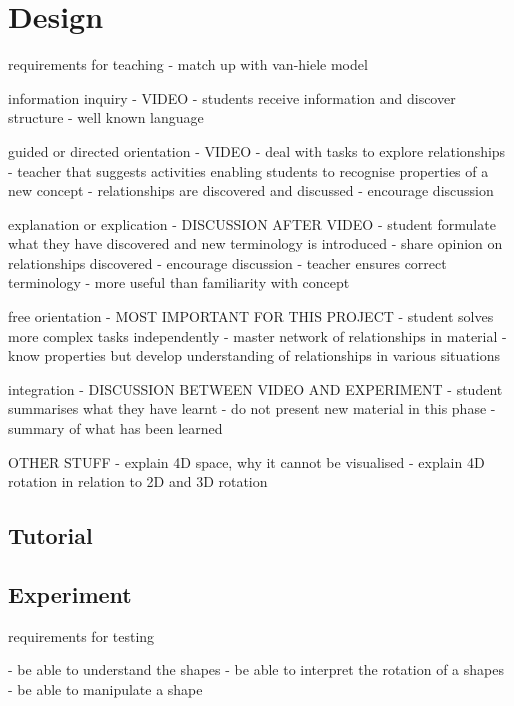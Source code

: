 \documentclass{l4proj}
\begin{document}
\chapter{Design}

requirements for teaching
 - match up with van-hiele model

 information inquiry - VIDEO
 - students receive information and discover structure
 - well known language

guided or directed orientation - VIDEO
 - deal with tasks to explore relationships
 - teacher that suggests activities enabling students to recognise properties of a new concept
 - relationships are discovered and discussed
   - encourage discussion

explanation or explication - DISCUSSION AFTER VIDEO
 - student formulate what they have discovered and new terminology is introduced
 - share opinion on relationships discovered
   - encourage discussion
 - teacher ensures correct terminology - more useful than familiarity with concept

free orientation - MOST IMPORTANT FOR THIS PROJECT
 - student solves more complex tasks independently
 - master network of relationships in material
 - know properties but develop understanding of relationships in various situations

integration - DISCUSSION BETWEEN VIDEO AND EXPERIMENT
 - student summarises what they have learnt
 - do not present new material in this phase
 - summary of what has been learned

OTHER STUFF
 - explain 4D space, why it cannot be visualised
 - explain 4D rotation in relation to 2D and 3D rotation

\section{Tutorial}



\section{Experiment}
\label{experimental_design}


requirements for testing

 - be able to understand the shapes
 - be able to interpret the rotation of a shapes
 - be able to manipulate a shape
\end{document}
